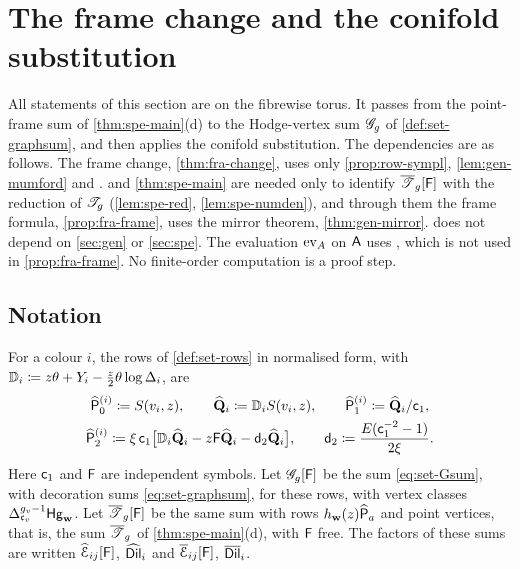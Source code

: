 \newcommand{\fraKB}{K_{\mathrm{B}}}              %
\newcommand{\fraTB}{\mathsf{T}_{\mathrm{B}}}     %
\newcommand{\fraGB}{\mathsf{G}_{\mathrm{B}}}     %
\newcommand{\fraMU}{\mathcal{M}(U)}              %
\newcommand{\fraJ}{\jmath}                       %
\section{The frame change and the conifold substitution}
\label{sec:fra}

All statements of this section are on the fibrewise torus. It passes from the point-frame sum of \cref{thm:spe-main}\textup{(d)} to the Hodge-vertex sum $\mathscr{G}_g$ of \cref{def:set-graphsum}, and then applies the conifold substitution. The dependencies are as follows. The frame change, \cref{thm:fra-change}, uses only \cref{prop:row-sympl}, \cref{lem:gen-mumford} and \cite[Definitions~2.2, 2.5, 2.13 and Proposition~2.14]{PPZ15}.  and \cref{thm:spe-main} are needed only to identify $\overline{\mathscr{T}}_g[\mathsf{F}]$ with the reduction of $\mathscr{T}_g$ (\cref{lem:spe-red}, \cref{lem:spe-numden}), and through them the frame formula, \cref{prop:fra-frame}, uses the mirror theorem, \cref{thm:gen-mirror}.  does not depend on \cref{sec:gen} or \cref{sec:spe}. The evaluation $\mathrm{ev}_{A}$ on $\mathsf{A}$ uses \cite[Lemma~4.2]{BFGW21}, which is not used in \cref{prop:fra-frame}. No finite-order computation is a proof step.

\subsection{Notation}

For a colour $i$, the rows of \cref{def:set-rows} in normalised form, with $\mathbb{D}_i\coloneqq z\theta+Y_i-\frac z2\theta\log\Delta_i$, are
\begin{gather*}
\widehat{\mathsf{P}}_0^{(i)}\coloneqq S(v_i,z),\qquad\widehat{\mathbf{Q}}_i\coloneqq\mathbb{D}_iS(v_i,z),\qquad\widehat{\mathsf{P}}_1^{(i)}\coloneqq\widehat{\mathbf{Q}}_i/\mathsf{c}_{1},\\
\widehat{\mathsf{P}}_2^{(i)}\coloneqq\xi\,\mathsf{c}_{1}\big[\mathbb{D}_i\widehat{\mathbf{Q}}_i-z\mathsf{F}\widehat{\mathbf{Q}}_i-\mathsf{d}_{2}\widehat{\mathbf{Q}}_i\big],\qquad\mathsf{d}_{2}\coloneqq\frac{E(\mathsf{c}_{1}^{-2}-1)}{2\xi}.
\end{gather*}
Here $\mathsf{c}_{1}$ and $\mathsf{F}$ are independent symbols. Let $\mathscr{G}_g[\mathsf{F}]$ be the sum \eqref{eq:set-Gsum}, with decoration sums \eqref{eq:set-graphsum}, for these rows, with vertex classes $\Delta_{\mathfrak{c}_v}^{g_v-1}\mathsf{Hg}_{\mathbf{w}}$. Let $\overline{\mathscr{T}}_g[\mathsf{F}]$ be the same sum with rows $h_{\mathbf{w}}(z)\widehat{\mathsf{P}}_a$ and point vertices, that is, the sum $\overline{\mathscr{T}}_g$ of \cref{thm:spe-main}\textup{(d)}, with $\mathsf{F}$ free. The factors of these sums are written $\widehat{\mathcal{E}}_{ij}[\mathsf{F}]$, $\widehat{\mathsf{Dil}}_i$ and $\overline{\mathcal{E}}_{ij}[\mathsf{F}]$, $\overline{\mathsf{Dil}}_i$.

